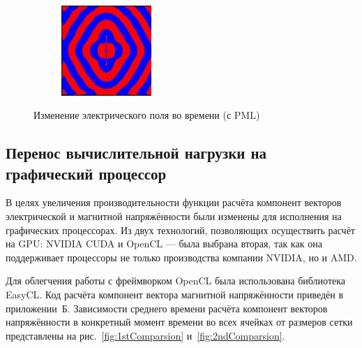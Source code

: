 \begin{figure}[p]
\begin{subfigure}[b]{0.3\textwidth}
    \end{subfigure}
    ~
    \begin{subfigure}[b]{0.3\textwidth}
        \includegraphics[width=\textwidth]{include/graphics/pml-on-5}
    \end{subfigure}

    \caption{Изменение электрического поля во времени (с PML)}\label{fig:EzPmlOn}
\end{figure}


\subsection{Перенос вычислительной нагрузки на графический процессор}

В целях увеличения производительности функции расчёта компонент векторов электрической и магнитной напряжённости были изменены
для исполнения на графических процессорах. Из двух технологий, позволяющих осуществить расчёт на GPU: NVIDIA CUDA и OpenCL --- была выбрана
вторая, так как она поддерживает процессоры не только производства компании NVIDIA, но и AMD.

Для облегчения работы с фреймворком OpenCL была использована библиотека EasyCL. Код расчёта компонент вектора магнитной напряжённости
приведён в приложении~Б. Зависимости среднего времени расчёта компонент векторов напряжённости в конкретный момент времени во всех ячейках от размеров сетки представлены на рис.~\ref{fig:1stComparsion} и~\ref{fig:2ndComparsion}.

